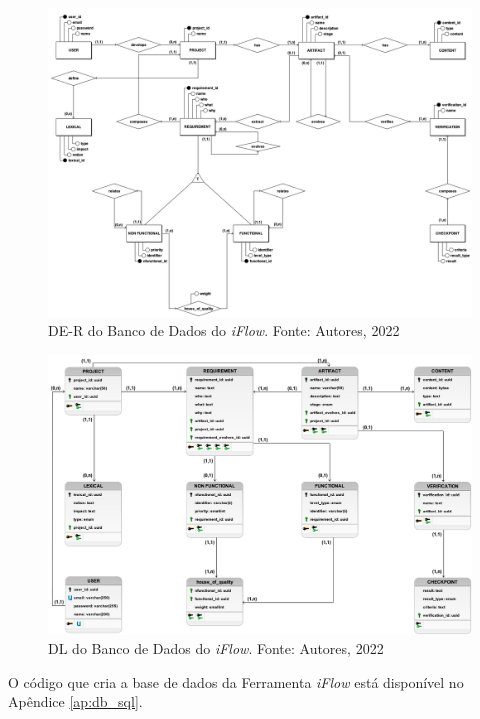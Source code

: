 \begin{figure}[H]
    \begin{center}
        \includegraphics[scale=0.29]{figuras/Proposta/Conceitual_iFlow.png}
        \caption{{DE-R do Banco de Dados do \textit{iFlow}. Fonte: Autores, 2022}}
        \label{fig:diagrama_conceitual}
    \end{center}
\end{figure}

\begin{figure}[H]
    \begin{center}
        \includegraphics[scale=0.35]{figuras/Proposta/Lógico_iFlow.png}
        \caption{{DL do Banco de Dados do \textit{iFlow}. Fonte: Autores, 2022}}
        \label{fig:diagrama_logico}
    \end{center}
\end{figure}

O código que cria a base de dados da Ferramenta \textit{iFlow} está disponível no Apêndice \ref{ap:db_sql}.